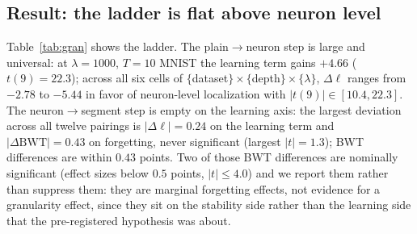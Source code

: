 \documentclass[review,12pt,number]{elsarticle}
\begin{document}
\subsection{Result: the ladder is flat above neuron level}

Table~\ref{tab:gran} shows the ladder. The plain$\to$neuron step is large
and universal: at $\lambda{=}1000$, $T{=}10$ MNIST the learning term gains
$+4.66$ ($t(9){=}22.3$); across all six cells of
$\{$dataset$\}\times\{$depth$\}\times\{\lambda\}$, $\Delta\ell$ ranges from
$-2.78$ to $-5.44$ in favor of neuron-level localization with
$|t(9)| \in [10.4, 22.3]$. The neuron$\to$segment step is empty on the learning axis: the
largest deviation across all twelve pairings is $|\Delta\ell| = 0.24$ on the learning
term and $|\Delta\mathrm{BWT}| = 0.43$ on forgetting,
never significant (largest $|t| = 1.3$); BWT differences are within
$0.43$ points. Two of those BWT differences are nominally significant
(effect sizes below $0.5$ points, $|t| \le 4.0$) and we report them rather
than suppress them: they are marginal forgetting effects, not evidence for
a granularity effect, since they sit on the stability side rather than the
learning side that the pre-registered hypothesis was about.
\end{document}
